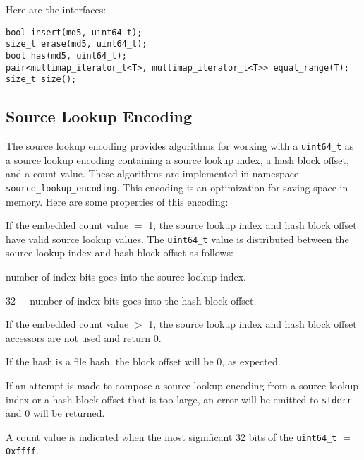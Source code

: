 \documentclass[12pt,twoside]{article}
\begin{document}
Here are the interfaces:
\begin{small}
\begin{verbatim}
bool insert(md5, uint64_t);
size_t erase(md5, uint64_t);
bool has(md5, uint64_t);
pair<multimap_iterator_t<T>, multimap_iterator_t<T>> equal_range(T);
size_t size();
\end{verbatim}
\end{small}

\subsection{Source Lookup Encoding}
The source lookup encoding provides algorithms for working with a
\texttt{uint64\_t}
as a source lookup encoding containing a source lookup index,
a hash block offset, and a count value.
These algorithms are
implemented in namespace \texttt{source\_lookup\_encoding}.
This encoding is an optimization for saving space in memory.
Here are some properties of this encoding:
\begin{compactitem}
\item If the embedded count value $=$ 1,
the source lookup index and hash block offset
have valid source lookup values.
The \texttt{uint64\_t} value is distributed between the
source lookup index and hash block offset as follows:
  \begin{compactitem}
  \item number of index bits goes into the source lookup index.
  \item 32 $-$ number of index bits goes into the hash block offset.
  \end{compactitem}
\item If the embedded count value $>$ 1,
the source lookup index and hash block offset accessors
are not used and return 0.
\item If the hash is a file hash, the block offset will be 0, as expected.
\item If an attempt is made to compose a source lookup encoding
from a source lookup index or a hash block offset
that is too large, an error will be emitted to \texttt{stderr}
and 0 will be returned.
\item A count value is indicated when the most significant 32 bits
of the \texttt{uint64\_t} $=$ \texttt{0xffff}.
\end{compactitem}

\end{document}
